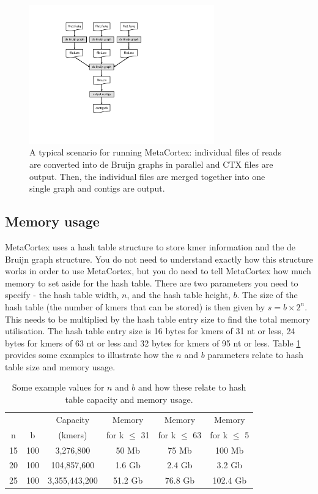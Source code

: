 \documentclass[a4paper,11pt,oneside]{article}
\begin{document}
\begin{figure}[tb]
\centering
\includegraphics[width=8cm]{typicalprocess.pdf}
\caption[Typical scenario]{A typical scenario for running MetaCortex: individual files of reads are converted into de Bruijn graphs in parallel and CTX files are output. Then, the individual files are merged together into one single graph and contigs are output.} 
\label{fig:typicalprocess}
\end{figure}

\subsection{Memory usage}

MetaCortex uses a hash table structure to store kmer information and the de Bruijn graph structure. You do not need to understand exactly how this structure works in order to use MetaCortex, but you do need to tell MetaCortex how much memory to set aside for the hash table. There are two parameters you need to specify - the hash table width, $n$, and the hash table height, $b$. The size of the hash table (the number of kmers that can be stored) is then given by $s = b \times 2^{n}$. This needs to be multiplied by the hash table entry size to find the total memory utilisation. The hash table entry size is 16 bytes for kmers of 31 nt or less, 24 bytes for kmers of 63 nt or less and 32 bytes for kmers of 95 nt or less. Table \ref{tab:examplememoryvalues} provides some examples to illustrate how the $n$ and $b$ parameters relate to hash table size and memory usage.

\begin{table}[htb]
\centering
\begin{tabular}{c c c c c c}
\hline
  &     & Capacity & Memory         & Memory          & Memory \\
n & b & (kmers)      & for k $\le$ 31 & for k $\le$ 63 & for k $\le$ 5  \\
\hline
15 & 100 & 3,276,800 & 50 Mb & 75 Mb & 100 Mb \\
20 & 100 & 104,857,600 & 1.6 Gb & 2.4 Gb & 3.2 Gb \\
25 & 100 & 3,355,443,200 & 51.2 Gb & 76.8 Gb & 102.4 Gb \\
\hline
\end{tabular}
\caption[Example values]{Some example values for $n$ and $b$ and how these relate to hash table capacity and memory usage.}
\label{tab:examplememoryvalues}
\end{table}
\end{document}
